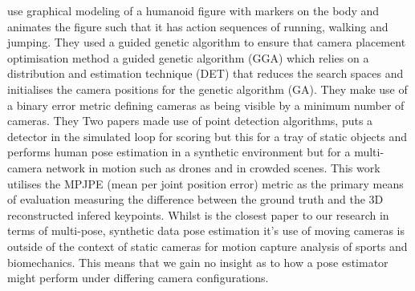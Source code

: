 \citet{aissaoui2018designing} use graphical modeling of a humanoid figure with markers on the body and animates the figure such that it has action sequences of running, walking and jumping. They used a guided genetic algorithm to ensure that  camera placement optimisation method a guided genetic algorithm (GGA) which relies on a distribution and estimation technique (DET) that reduces the search spaces and initialises the camera positions for the genetic algorithm (GA). They make use of a binary error metric defining cameras as being visible by a minimum number of cameras. They 
Two papers made use of point detection algorithms, \citet{jorgensen2018simulation} puts a detector in the simulated loop for scoring but this for a tray of static objects and \citet{ci2023proactive} performs human pose estimation in a synthetic environment but for a multi-camera network in motion such as drones and in crowded scenes. This work utilises the MPJPE (mean per joint position error) metric as the primary means of evaluation measuring the difference between the ground truth and the 3D reconstructed infered keypoints. 
Whilst \citet{ci2023proactive} is the closest paper to our research in terms of multi-pose, synthetic data pose estimation it's use of moving cameras is outside of the context of static cameras for motion capture analysis of sports and biomechanics. 
This means that we gain no insight as to how a pose estimator might perform under differing camera configurations. 
